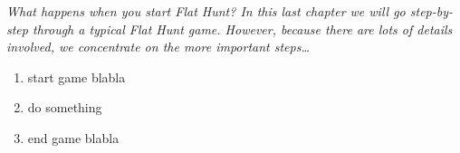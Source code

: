 \emph{What happens when you start \emph{Flat Hunt}? In this last chapter we will go step-by-step through a typical \emph{Flat Hunt} game. However, because there are lots of details involved, we concentrate on the more important steps\ldots}

\begin{enumerate}
  \item start game blabla
  \item do something
  \item end game blabla
\end{enumerate}
